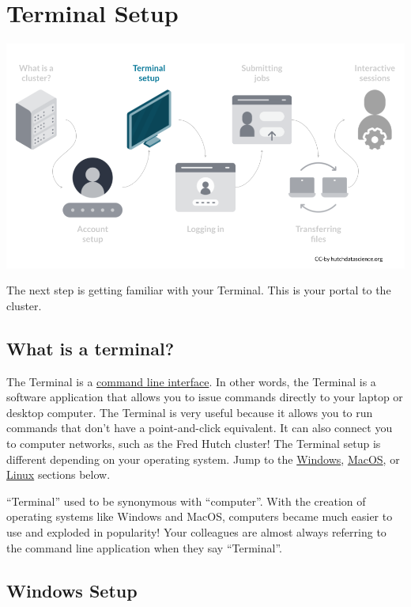 \documentclass[
]{book}
\begin{document}
\hypertarget{terminal}{%
\chapter{Terminal Setup}\label{terminal}}

\begin{center}\includegraphics[width=0.8\linewidth]{resources/images/03-terminal_files/figure-latex//1BQxrVYdKZTbpCaF-i_q9w7s9x034lEXpQZDU-Sl09cs_gff2211b72f_1_183} \end{center}

The next step is getting familiar with your Terminal. This is your portal to the cluster.

\hypertarget{what-is-a-terminal}{%
\section{What is a terminal?}\label{what-is-a-terminal}}

The Terminal is a \href{https://www.codecademy.com/article/command-line-interface}{command line interface}. In other words, the Terminal is a software application that allows you to issue commands directly to your laptop or desktop computer. The Terminal is very useful because it allows you to run commands that don't have a point-and-click equivalent. It can also connect you to computer networks, such as the Fred Hutch cluster! The Terminal setup is different depending on your operating system. Jump to the \protect\hyperlink{windows}{Windows}, \protect\hyperlink{mac}{MacOS}, or \protect\hyperlink{linux}{Linux} sections below.

``Terminal'' used to be synonymous with ``computer''. With the creation of operating systems like Windows and MacOS, computers became much easier to use and exploded in popularity! Your colleagues are almost always referring to the command line application when they say ``Terminal''.

\hypertarget{windows}{%
\section{Windows Setup}\label{windows}}
\end{document}
